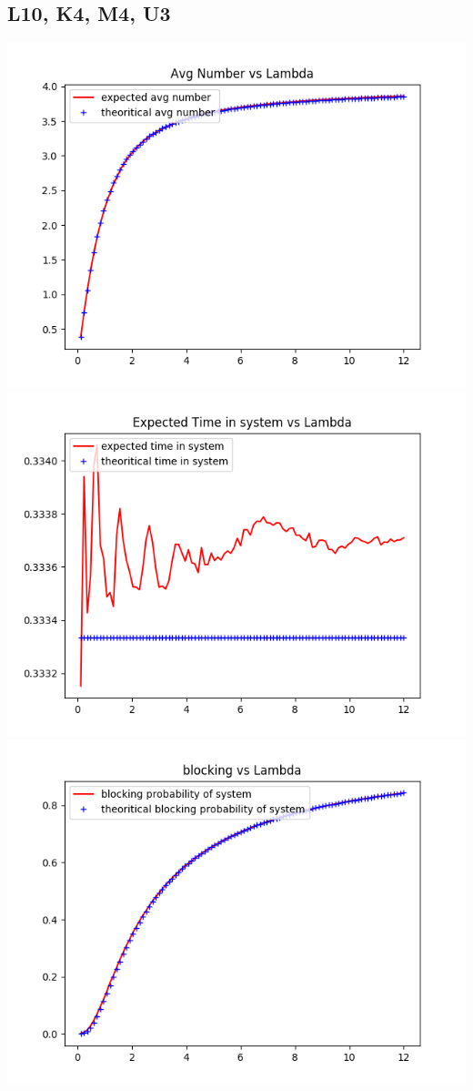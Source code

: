 \documentclass[11pt]{article}
\begin{document}
 \subsection{L10, K4, M4, U3}
 \includegraphics{ExpectedNumber_L10_K4_M4_U3}
  \includegraphics{ExpectedTime_L10_K4_M4_U3}
 \includegraphics{BlockingProbability_L10_K4_M4_U3}
\end{document}
